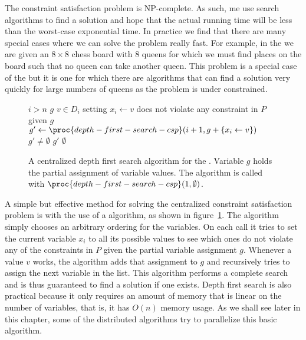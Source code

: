 The constraint satisfaction problem is NP-complete. As such, me use
search algorithms to find a solution and hope that the actual running
time will be less than the worst-case exponential time. In practice we
find that there are many special cases where we can solve the problem
really fast. For example, in the  we are given an
$8 \times 8$ chess board with $8$ queens for which we must find places
on the board such that no queen can take another queen.  This problem
is a special case of the  but it is one for which there are
algorithms that can find a solution very quickly for large numbers of
queens as the problem is under constrained.

\begin{SCfigure}
  \begin{minipage}{1.0\linewidth}
  \begin{codebox}
    \li \If $i > n$ 
    \li \Then \Return $g$
        \End
    \li \For $v \in D_i$ 
    \li \Do \If setting $x_i \gets v$ does not violate any constraint in
    $P$ given $g$ 
    \li     \Then $g' \gets \proc{depth-first-search-csp}(i+1 , g + \{x_i \gets v\})$ 
    \li           \If $g' \neq \emptyset$
    \li           \Then \Return $g'$
    \li           \End
             \End
         \End
    \li \Return $\emptyset$
  \end{codebox}
  \end{minipage}
  \caption{A centralized depth first search algorithm for the .
    Variable $g$ holds the partial assignment of variable values. The
    algorithm is called with
    $\proc{depth-first-search-csp}(1,\emptyset)$.}
  \label{fig:dfs-csp}
\end{SCfigure}

A simple but effective method for solving the centralized constraint
satisfaction problem is with the use of a 
algorithm, as shown in figure~\ref{fig:dfs-csp}. The algorithm simply
chooses an arbitrary ordering for the variables. On each call it
tries to set the current variable $x_i$ to all its possible values to
see which ones do not violate any of the constraints in $P$ given the
partial variable assignment $g$. Whenever a value $v$ works, the
algorithm adds that assignment to $g$ and recursively tries to assign
the next variable in the list. This algorithm performs a complete
search and is thus guaranteed to find a solution if one exists. Depth
first search is also practical because it only requires an amount of
memory that is linear on the number of variables, that is, it has
$O(n)$ memory usage.  As we shall see later in this chapter, some of
the distributed algorithms try to parallelize this basic algorithm.

